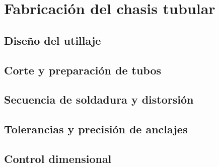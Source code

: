 \chapter{Fabricación del chasis tubular}
\label{ch:fabricacion_tubular}

\begin{objetivos}
  \item {}
  \item {}
  \item {}
\end{objetivos}


\section{Diseño del utillaje}
\label{sec:fabricacion_tubular:01}

\section{Corte y preparación de tubos}
\label{sec:fabricacion_tubular:02}

\section{Secuencia de soldadura y distorsión}
\label{sec:fabricacion_tubular:03}

\section{Tolerancias y precisión de anclajes}
\label{sec:fabricacion_tubular:04}

\section{Control dimensional}
\label{sec:fabricacion_tubular:05}


